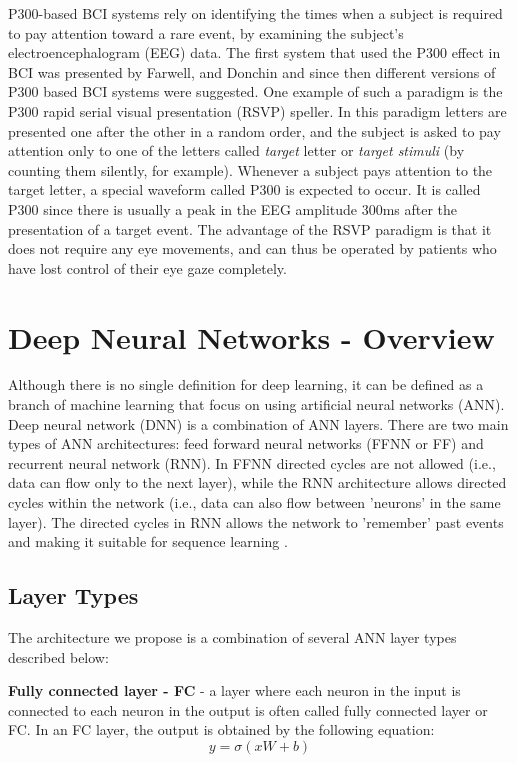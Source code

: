 \documentclass[
12pt, %
english, %
doublespacing, %
headsepline, %
]{MastersDoctoralThesis} %
\begin{document}
P300-based BCI systems rely on identifying the times when a subject is required to pay attention toward a rare event, by examining the subject's electroencephalogram (EEG) data. The first system that used the P300 effect in BCI was presented by Farwell, and Donchin \cite{FirstP300} and since then different versions of P300 based BCI systems were suggested. One example of such a paradigm is the P300 rapid serial visual presentation (RSVP) speller. In this paradigm letters are presented one after the other in a random order, and the subject is asked to pay attention only to one of the letters called \textit{target} letter or \textit{target stimuli} (by counting them silently, for example). Whenever a subject pays attention to the target letter, a special waveform called P300 is expected to occur. It is called P300 since there is usually a peak in the EEG amplitude 300ms after the presentation of a target event. The advantage of the RSVP paradigm is that it does not require any eye movements, and can thus be operated by patients who have lost control of their eye gaze completely.

\section{Deep Neural Networks - Overview}

Although there is no single definition for deep learning, it can be defined as a branch of machine learning that focus on using artificial neural networks (ANN). Deep neural network (DNN) is a combination of ANN layers. There are two main types of ANN architectures: feed forward neural networks (FFNN or FF) and recurrent neural network (RNN). In FFNN directed cycles are not allowed (i.e., data can flow only to the next layer), while the RNN architecture allows directed cycles within the network (i.e., data can also flow between 'neurons' in the same layer). The directed cycles in RNN allows the network to 'remember' past events and making it suitable for sequence learning \cite{rumelhart1985learning}.

\subsection{Layer Types}
The architecture we propose is a combination of several ANN layer types described below:

\textbf{Fully connected layer - FC} - a layer where each neuron in the input is connected to each neuron in the output is often called fully connected layer or FC. In an FC layer, the output is obtained by the following equation:
\[y=\sigma \left( {xW + b} \right)\]
\end{document}
